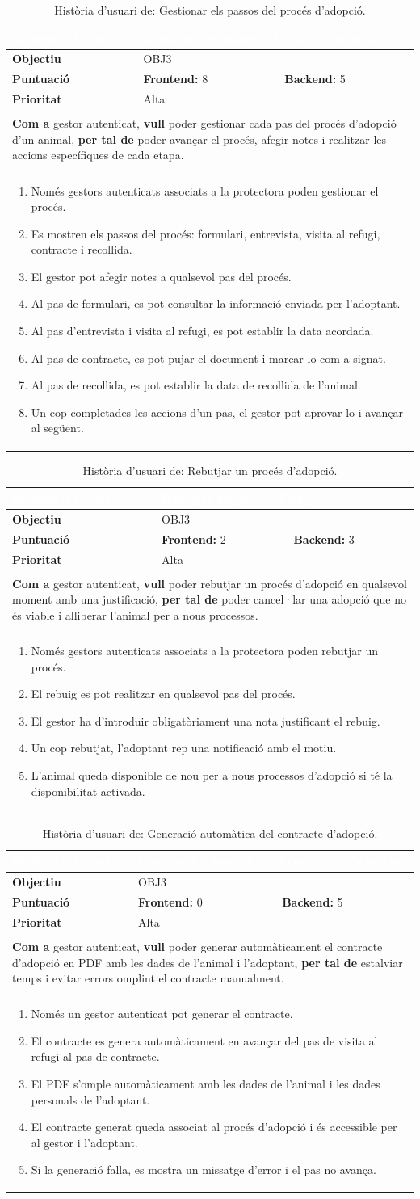 \documentclass[11pt,a4paper]{report}
\newcommand{\HU}[9]{%
\begin{table}[H]\centering\footnotesize\renewcommand{\arraystretch}{1.1}%
\setlength{\extrarowheight}{0pt}%
\begin{tabular}{|l|p{4.8cm}|p{4.8cm}|}\hline
\rowcolor{oceanblue}\textcolor{white}{\textbf{Història d'Usuari}} & \multicolumn{2}{l|}{\textcolor{white}{#2}} \\\hline
\textbf{Objectiu} & \multicolumn{2}{l|}{#1} \\\hline
\rowcolor{gray!10}\textbf{Puntuació} & \textbf{Frontend: } #3 & \textbf{Backend: } #4 \\\hline
\textbf{Prioritat} & \multicolumn{2}{l|}{#5} \\\hline
\rowcolor{oceanblue}\multicolumn{3}{|l|}{\textcolor{white}{\textbf{Descripció}}} \\\hline
\multicolumn{3}{|p{12.5cm}|}{\textbf{Com a} #6, \textbf{vull} #7, \textbf{per tal de} #8.} \\\hline
\rowcolor{oceanblue}\multicolumn{3}{|l|}{\textcolor{white}{\textbf{Criteris d'Acceptació}}} \\\hline
\multicolumn{3}{|p{12.5cm}|}{\begin{enumerate}[leftmargin=0.4cm,topsep=0pt,parsep=0pt,itemsep=1pt,partopsep=0pt,after=\vspace{-3pt}] #9 \end{enumerate}} \\\hline
\end{tabular}\caption[HU: #2]{Història d'usuari de: #2.}\label{tab:hu_#1}\end{table}%
}
\begin{document}
    \HU{OBJ3}
    {Gestionar els passos del procés d'adopció}
    {8}
    {5}
    {Alta}
    {gestor autenticat}
    {poder gestionar cada pas del procés d'adopció d'un animal}
    {poder avançar el procés, afegir notes i realitzar les accions específiques de cada etapa}
    {
        \item Només gestors autenticats associats a la protectora poden gestionar el procés.
        \item Es mostren els passos del procés: formulari, entrevista, visita al refugi, contracte i recollida.
        \item El gestor pot afegir notes a qualsevol pas del procés.
        \item Al pas de formulari, es pot consultar la informació enviada per l'adoptant.
        \item Al pas d'entrevista i visita al refugi, es pot establir la data acordada.
        \item Al pas de contracte, es pot pujar el document i marcar-lo com a signat.
        \item Al pas de recollida, es pot establir la data de recollida de l'animal.
        \item Un cop completades les accions d'un pas, el gestor pot aprovar-lo i avançar al següent.
    }
    \HU{OBJ3}
    {Rebutjar un procés d'adopció}
    {2}
    {3}
    {Alta}
    {gestor autenticat}
    {poder rebutjar un procés d'adopció en qualsevol moment amb una justificació}
    {poder cancel·lar una adopció que no és viable i alliberar l'animal per a nous processos}
    {
        \item Només gestors autenticats associats a la protectora poden rebutjar un procés.
        \item El rebuig es pot realitzar en qualsevol pas del procés.
        \item El gestor ha d'introduir obligatòriament una nota justificant el rebuig.
        \item Un cop rebutjat, l'adoptant rep una notificació amb el motiu.
        \item L'animal queda disponible de nou per a nous processos d'adopció si té la disponibilitat activada.
    }

    \HU{OBJ3}
    {Generació automàtica del contracte d'adopció}
    {0}
    {5}
    {Alta}
    {gestor autenticat}
    {poder generar automàticament el contracte d'adopció en PDF amb les dades de l'animal i l'adoptant}
    {estalviar temps i evitar errors omplint el contracte manualment}
    {
        \item Només un gestor autenticat pot generar el contracte.
        \item El contracte es genera automàticament en avançar del pas de visita al refugi al pas de contracte.
        \item El PDF s'omple automàticament amb les dades de l'animal i les dades personals de l'adoptant.
        \item El contracte generat queda associat al procés d'adopció i és accessible per al gestor i l'adoptant.
        \item Si la generació falla, es mostra un missatge d'error i el pas no avança.
    }
\end{document}
